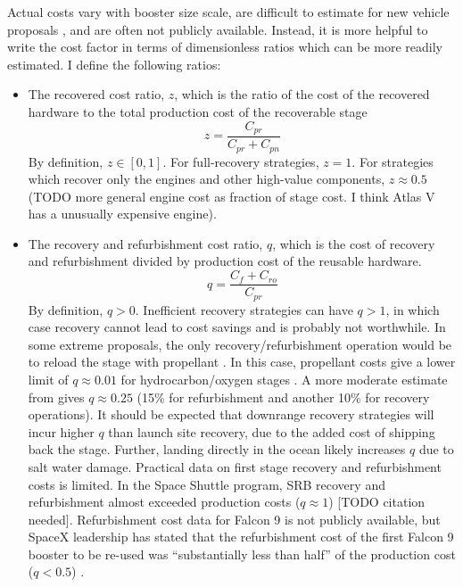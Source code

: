 \documentclass[conf]{new-aiaa}
\begin{document}
Actual costs vary with booster size scale, are difficult to estimate for new vehicle proposals \cite{Sforza2015}, and are often not publicly available. Instead, it is more helpful to write the cost factor in terms of dimensionless ratios which can be more readily estimated. I define the following ratios:
\begin{itemize}
	\item The recovered cost ratio, $z$, which is the ratio of the cost of the recovered hardware to the total production cost of the recoverable stage
    \begin{equation}
    z = \frac{C_{pr}}{C_{pr} + C_{pn}}
    \end{equation}
    By definition, $z \in [0, 1]$. For full-recovery strategies, $z=1$. For strategies which recover only the engines and other high-value components, $z \approx 0.5$ \cite{Ragab2015} (TODO more general engine cost as fraction of stage cost. I think Atlas V has a unusually expensive engine).
    
    \item The recovery and refurbishment cost ratio, $q$, which is the cost of recovery and refurbishment divided by production cost of the reusable hardware.
    \begin{equation}
    q = \frac{C_{f} + C_{ro}}{C_{pr}}
    \end{equation}
    By definition, $q > 0$. Inefficient recovery strategies can have $q > 1$, in which case recovery cannot lead to cost savings and is probably not worthwhile. In some extreme proposals, the only recovery/refurbishment operation would be to reload the stage with propellant \cite{Musk2017}. In this case, propellant costs give a lower limit of $q \approx 0.01$ for hydrocarbon/oxygen stages \cite{Ragab2015}. A more moderate estimate from \cite{Sforza2015} gives $q \approx 0.25$ (15\% for refurbishment and another 10\% for recovery operations). It should be expected that downrange recovery strategies will incur higher $q$ than launch site recovery, due to the added cost of shipping back the stage. Further, landing directly in the ocean likely increases $q$ due to salt water damage. Practical data on first stage recovery and refurbishment costs is limited. In the Space Shuttle program, SRB recovery and refurbishment almost exceeded production costs ($q \approx 1$) [TODO citation needed]. Refurbishment cost data for Falcon 9 is not publicly available, but SpaceX leadership has stated that the refurbishment cost of the first Falcon 9 booster to be re-used was ``substantially less than half'' of the production cost ($q<0.5$) \cite{Foust2017}.
   

\end{itemize}
\end{document}
